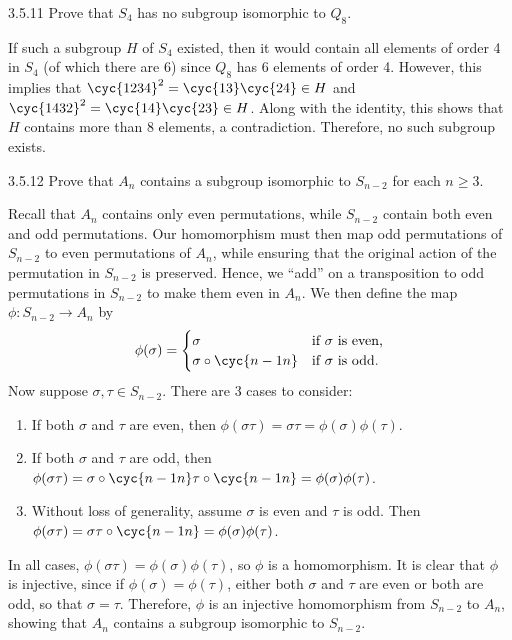 \begin{exercise}{3.5.11}
    Prove that $S_4$ has no subgroup isomorphic to $Q_8$.
\end{exercise}

\begin{sol}
    If such a subgroup $H$ of $S_4$ existed, then it would contain all elements of order 4 in $S_4$ (of which there are 6) since $Q_8$ has 6 elements of order 4.
	However, this implies that $\cyc{1 2 3 4}^2 = \cyc{1 3}\cyc{2 4} \in H$ and $\cyc{1 4 3 2}^2 = \cyc{1 4}\cyc{2 3} \in H$.
	Along with the identity, this shows that $H$ contains more than 8 elements, a contradiction.
	Therefore, no such subgroup exists.
\end{sol}

\begin{exercise}{3.5.12}
    Prove that $A_n$ contains a subgroup isomorphic to $S_{n-2}$ for each $n\ge3$.
\end{exercise}

\begin{sol}
    Recall that $A_n$ contains only even permutations, while $S_{n - 2}$ contain both even and odd permutations.
	Our homomorphism must then map odd permutations of $S_{n - 2}$ to even permutations of $A_n$, while ensuring that the original action of the permutation in $S_{n - 2}$ is preserved.
	Hence, we ``add'' on a transposition to odd permutations in $S_{n - 2}$ to make them even in $A_n$.
	We then define the map $\phi: S_{n - 2} \to A_n$ by
    \[
    	\phi(\sigma) = 
        \begin{cases}
            \sigma & \text{if $\sigma$ is even,}\\
            \sigma \circ \cyc{n - 1 n} & \text{if $\sigma$ is odd.}
        \end{cases}
	\]
    Now suppose $\sigma, \tau \in S_{n - 2}$.
	There are 3 cases to consider:
    \begin{enumerate}
        \item If both $\sigma$ and $\tau$ are even, then $\phi(\sigma\tau) = \sigma\tau = \phi(\sigma)\phi(\tau)$.
        \item If both $\sigma$ and $\tau$ are odd, then $\phi(\sigma\tau) = \sigma \circ \cyc{n - 1 n}\tau \circ \cyc{n - 1 n} = \phi(\sigma)\phi(\tau)$.
        \item Without loss of generality, assume $\sigma$ is even and $\tau$ is odd.
	Then $\phi(\sigma\tau) = \sigma\tau \circ \cyc{n - 1 n} = \phi(\sigma)\phi(\tau)$.
    \end{enumerate}
    In all cases, $\phi(\sigma\tau) = \phi(\sigma)\phi(\tau)$, so $\phi$ is a homomorphism.
	It is clear that $\phi$ is injective, since if $\phi(\sigma) = \phi(\tau)$, either both $\sigma$ and $\tau$ are even or both are odd, so that $\sigma = \tau$.
	Therefore, $\phi$ is an injective homomorphism from $S_{n - 2}$ to $A_n$, showing that $A_n$ contains a subgroup isomorphic to $S_{n - 2}$.
\end{sol}

